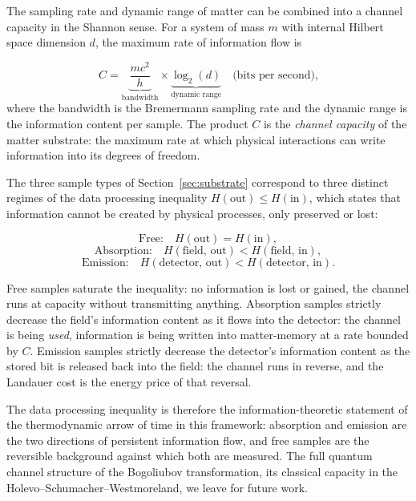 \documentclass[12pt,a4paper]{article}
\begin{document}
The sampling rate and dynamic range of matter can be combined into 
a channel capacity in the Shannon sense. For a system of mass $m$ 
with internal Hilbert space dimension $d$, the maximum rate of 
information flow is

\begin{equation}
    C = \underbrace{\frac{mc^2}{h}}_{\text{bandwidth}} 
        \times 
        \underbrace{\log_2(d)}_{\text{dynamic range}}
        \quad \text{(bits per second),}
    \label{eq:channel_capacity}
\end{equation}
where the bandwidth is the Bremermann sampling rate and the dynamic 
range is the information content per sample. The product 
$C$ is the \emph{channel capacity} of the matter substrate: the 
maximum rate at which physical interactions can write information 
into its degrees of freedom.

The three sample types of Section~\ref{sec:substrate} correspond 
to three distinct regimes of the data processing inequality 
$H(\text{out}) \leq H(\text{in})$, which states that information 
cannot be created by physical processes, only preserved or lost:

\begin{equation}
\text{Free:} \quad H(\text{out}) = H(\text{in}), 
\end{equation}
\begin{equation}
\text{Absorption:} \quad H(\text{field, out}) < H(\text{field, in}),
\end{equation}
\begin{equation}
\text{Emission:} \quad H(\text{detector, out}) < H(\text{detector, in}).
\end{equation}

Free samples saturate the inequality: no information is lost or 
gained, the channel runs at capacity without transmitting anything. 
Absorption samples strictly decrease the field's information content 
as it flows into the detector: the channel is being \emph{used}, 
information is being written into matter-memory at a rate bounded 
by $C$. Emission samples strictly decrease the detector's information 
content as the stored bit is released back into the field: the 
channel runs in reverse, and the Landauer cost is the energy 
price of that reversal.

The data processing inequality is therefore the information-theoretic 
statement of the thermodynamic arrow of time in this framework: 
absorption and emission are the two directions of persistent 
information flow, and free samples are the reversible background 
against which both are measured. The full quantum channel structure 
of the Bogoliubov transformation, its classical capacity in the 
Holevo--Schumacher--Westmoreland, we leave for future work.
\end{document}
